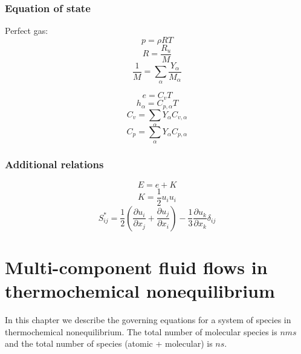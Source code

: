 \documentclass[oneside,a4paper,11pt]{report}
\begin{document}
\subsection{Equation of state}
Perfect gas:
\begin{equation}
    p = \rho R T 
\end{equation}
\begin{equation}
    R = \frac{R_u}{M}
\end{equation}
\begin{equation}
    \frac{1}{M} = \sum_\alpha \frac{Y_\alpha}{M_\alpha}
\end{equation}

\begin{equation}
    e = C_v T
\end{equation}
\begin{equation}
    h_\alpha = C_{p,\alpha} T
\end{equation}
\begin{equation}
    C_v = \sum_\alpha Y_\alpha C_{v,\alpha}
\end{equation}
\begin{equation}
    C_p = \sum_\alpha Y_\alpha C_{p,\alpha}
\end{equation}

\subsection{Additional relations}
\begin{equation}
E = e + K
\end{equation}
\begin{equation}
K = \frac{1}{2} u_i u_i
\end{equation}
\begin{equation}
    S^*_{ij} = \frac{1}{2} \left ( \frac{\partial u_i}{\partial x_j} + \frac{\partial u_j}{\partial x_i} \right ) - \frac{1}{3} \frac{\partial u_k}{\partial x_k} \delta_{ij}
\end{equation}

%
\chapter{Multi-component fluid flows in thermochemical nonequilibrium}
%
In this chapter we describe the governing equations for a system of species in thermochemical nonequilibrium. The total number of molecular species is $nms$ and the total number of species (atomic + molecular) is $ns$.
\end{document}

